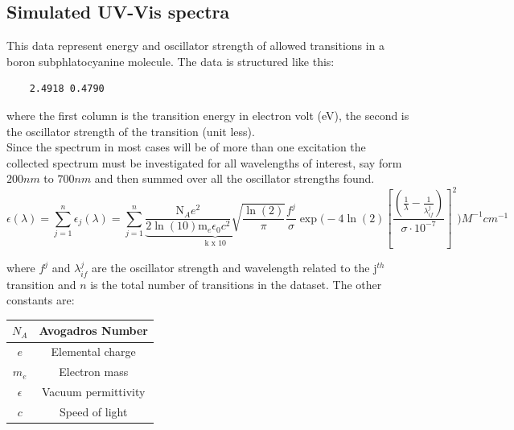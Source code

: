 \documentclass{article}
\begin{document}
\newpage
\subsection{Simulated UV-Vis spectra}
This data represent energy and oscillator strength of allowed transitions in a boron subphlatocyanine molecule. The data is structured like this:
\begin{lstlisting}
    2.4918 0.4790
\end{lstlisting}
where the first column is the transition energy in electron volt (eV), the second is the oscillator strength of the transition (unit less).\\

Since the spectrum in most cases will be of more than one excitation the collected spectrum must be investigated for all wavelengths of interest, say form $200\si{nm}$ to $700\si{nm}$ and then summed over all the oscillator strengths found.
\begin{equation}
\epsilon(\lambda)=\sum_{j=1}^n \epsilon_j(\lambda)=\sum_{j=1}^n  \underbrace{\frac{\text{N}_A\si{e^2}}{2\ln(10) \text{m}_e \epsilon_0\si{c^2}} \sqrt{\frac{\ln(2)}{\pi}}}_\text{k x 10} \frac{f^j}{\sigma} \exp{\Bigg(-4 \ln(2) \left[\frac{\left(\frac{1}{\lambda}-\frac{1}{\lambda_{if}^j}\right)}{\sigma\cdot 10^{-7}}\right]^2}\Bigg) \si{M^{-1}cm^{-1}} \label{eq_uv_vis}
\end{equation}

where $f^j$ and $\lambda_{if}^j$ are the oscillator strength and wavelength related to the $\text{j}^{th}$ transition and $n$ is the total number of transitions in the dataset. The other constants are:

\begin{center}
\begin{tabular}{|c|c|}
\hline 
$N_A$ & Avogadros Number \\ 
\hline 
$e$ & Elemental charge \\ 
\hline 
$m_e$ & Electron mass \\ 
\hline 
$\epsilon$ & Vacuum permittivity \\ 
\hline 
$c$ & Speed of light \\ 
\hline 
\end{tabular} 
\end{center}
\end{document}
